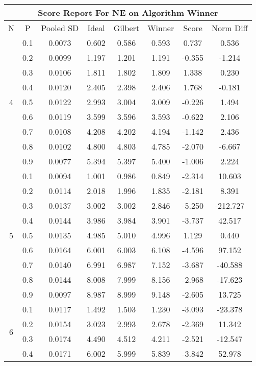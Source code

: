 \documentclass[11pt,a4paper]{report}
\begin{document}
\begin{longtable}{ | c | c || c | c | c | c | c | c | }
\hline
\multicolumn{8}{|c|}{ Score Report For NE on Algorithm Winner} \\
\hline
N & P & Pooled SD &  Ideal &  Gilbert & Winner  & Score & Norm Diff \\
 \hline
 \hline
 \endhead
\multirow{9}{*}{4} & 0.1 & 0.0073 & 0.602 & 0.586 & 0.593 & 0.737 & 0.536 \\
 & 0.2 & 0.0099 & 1.197 & 1.201 & 1.191 & -0.355 & -1.214 \\
 & 0.3 & 0.0106 & 1.811 & 1.802 & 1.809 & 1.338 & 0.230 \\
 & 0.4 & 0.0120 & 2.405 & 2.398 & 2.406 & 1.768 & -0.181 \\
 & 0.5 & 0.0122 & 2.993 & 3.004 & 3.009 & -0.226 & 1.494 \\
 & 0.6 & 0.0119 & 3.599 & 3.596 & 3.593 & -0.622 & 2.106 \\
 & 0.7 & 0.0108 & 4.208 & 4.202 & 4.194 & -1.142 & 2.436 \\
 & 0.8 & 0.0102 & 4.800 & 4.803 & 4.785 & -2.070 & -6.667 \\
 & 0.9 & 0.0077 & 5.394 & 5.397 & 5.400 & -1.006 & 2.224 \\
 \hline
\multirow{9}{*}{5} & 0.1 & 0.0094 & 1.001 & 0.986 & 0.849 & -2.314 & 10.603 \\
 & 0.2 & 0.0114 & 2.018 & 1.996 & 1.835 & -2.181 & 8.391 \\
 & 0.3 & 0.0137 & 3.002 & 3.002 & 2.846 & -5.250 & -212.727 \\
 & 0.4 & 0.0144 & 3.986 & 3.984 & 3.901 & -3.737 & 42.517 \\
 & 0.5 & 0.0135 & 4.985 & 5.010 & 4.996 & 1.129 & 0.440 \\
 & 0.6 & 0.0164 & 6.001 & 6.003 & 6.108 & -4.596 & 97.152 \\
 & 0.7 & 0.0140 & 6.991 & 6.987 & 7.152 & -3.687 & -40.588 \\
 & 0.8 & 0.0144 & 8.008 & 7.999 & 8.156 & -2.968 & -17.623 \\
 & 0.9 & 0.0097 & 8.987 & 8.999 & 9.148 & -2.605 & 13.725 \\
 \hline
\multirow{9}{*}{6} & 0.1 & 0.0117 & 1.492 & 1.503 & 1.230 & -3.093 & -23.378 \\
 & 0.2 & 0.0154 & 3.023 & 2.993 & 2.678 & -2.369 & 11.342 \\
 & 0.3 & 0.0174 & 4.490 & 4.512 & 4.211 & -2.521 & -12.547 \\
 & 0.4 & 0.0171 & 6.002 & 5.999 & 5.839 & -3.842 & 52.978 \\

\end{longtable}
\end{document}
